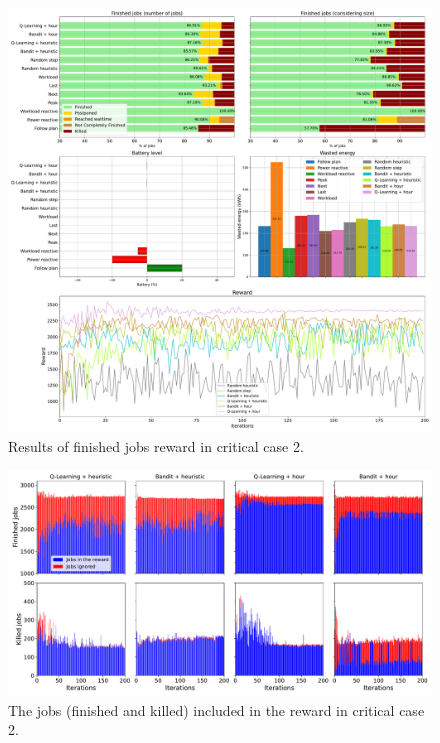 \begin{figure}[!htb]
    \centering
    \includegraphics[scale=0.29]{Images/Learning_compensations/reward_finished_touched_profile_best_workload_2_with_noise_state_delta.pdf}
    \caption{Results of finished jobs reward in critical case 2.}
    \label{fig:touched_reward_results_critical_2}
\end{figure}

\begin{figure}[!htb]
    \centering
    \includegraphics[scale=0.33]{Images/Learning_compensations/ignored_jobs_touched_scenario_2.pdf}
    \caption{The jobs (finished and killed) included in the reward in critical case 2.}
    \label{fig:reward_from_jobs_critical_2}
\end{figure}

